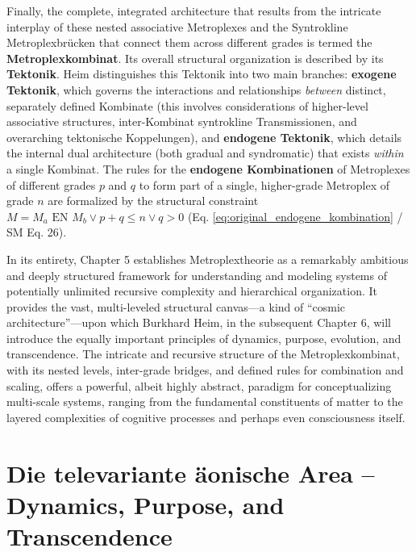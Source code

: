\documentclass[12pt]{article}
\newcommand{\q}[1]{\enquote{#1}}
\def\metroplex#1#2{M}%
\begin{document}
Finally, the complete, integrated architecture that results from the intricate interplay of these nested associative Metroplexes and the Syntrokline Metroplexbrücken that connect them across different grades is termed the \textbf{Metroplexkombinat}. Its overall structural organization is described by its \textbf{Tektonik}. Heim distinguishes this Tektonik into two main branches: \textbf{exogene Tektonik}, which governs the interactions and relationships \textit{between} distinct, separately defined Kombinate (this involves considerations of higher-level associative structures, inter-Kombinat syntrokline Transmissionen, and overarching tektonische Koppelungen), and \textbf{endogene Tektonik}, which details the internal dual architecture (both gradual and syndromatic) that exists \textit{within} a single Kombinat. The rules for the \textbf{endogene Kombinationen} of Metroplexes of different grades \( p \) and \( q \) to form part of a single, higher-grade Metroplex of grade \( n \) are formalized by the structural constraint \( \metroplex{n}{} = {\metroplex{p}{}_a} \text{ EN } {\metroplex{q}{}_b} \vee p+q \leq n \vee q > 0 \) (Eq. \eqref{eq:original_endogene_kombination} / SM Eq. 26).

In its entirety, Chapter 5 establishes Metroplextheorie as a remarkably ambitious and deeply structured framework for understanding and modeling systems of potentially unlimited recursive complexity and hierarchical organization. It provides the vast, multi-leveled structural canvas—a kind of \q{cosmic architecture}—upon which Burkhard Heim, in the subsequent Chapter 6, will introduce the equally important principles of dynamics, purpose, evolution, and transcendence. The intricate and recursive structure of the Metroplexkombinat, with its nested levels, inter-grade bridges, and defined rules for combination and scaling, offers a powerful, albeit highly abstract, paradigm for conceptualizing multi-scale systems, ranging from the fundamental constituents of matter to the layered complexities of cognitive processes and perhaps even consciousness itself.

\clearpage


\section{Die televariante äonische Area – Dynamics, Purpose, and Transcendence}
\label{sec:chapter6}
\end{document}

